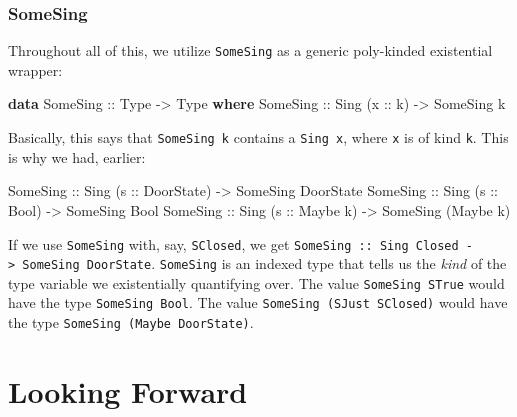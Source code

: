 \documentclass[]{article}
\newenvironment{Shaded}{}{}
\newcommand{\DataTypeTok}[1]{\textcolor[rgb]{0.56,0.13,0.00}{#1}}
\newcommand{\KeywordTok}[1]{\textcolor[rgb]{0.00,0.44,0.13}{\textbf{#1}}}
\newcommand{\NormalTok}[1]{#1}
\newcommand{\OtherTok}[1]{\textcolor[rgb]{0.00,0.44,0.13}{#1}}
\begin{document}
\hypertarget{somesing}{%
\subsubsection{SomeSing}\label{somesing}}

Throughout all of this, we utilize \texttt{SomeSing} as a generic poly-kinded
existential wrapper:

\begin{Shaded}
\begin{Highlighting}[]
\KeywordTok{data} \DataTypeTok{SomeSing}\OtherTok{ ::} \DataTypeTok{Type} \OtherTok{->} \DataTypeTok{Type} \KeywordTok{where}
    \DataTypeTok{SomeSing}\OtherTok{ ::} \DataTypeTok{Sing}\NormalTok{ (}\OtherTok{x ::}\NormalTok{ k) }\OtherTok{->} \DataTypeTok{SomeSing}\NormalTok{ k}
\end{Highlighting}
\end{Shaded}

Basically, this says that \texttt{SomeSing\ k} contains a \texttt{Sing\ x},
where \texttt{x} is of kind \texttt{k}. This is why we had, earlier:

\begin{Shaded}
\begin{Highlighting}[]
\DataTypeTok{SomeSing}\OtherTok{ ::} \DataTypeTok{Sing}\NormalTok{ (}\OtherTok{s ::} \DataTypeTok{DoorState}\NormalTok{) }\OtherTok{->} \DataTypeTok{SomeSing} \DataTypeTok{DoorState}
\DataTypeTok{SomeSing}\OtherTok{ ::} \DataTypeTok{Sing}\NormalTok{ (}\OtherTok{s ::} \DataTypeTok{Bool}\NormalTok{)      }\OtherTok{->} \DataTypeTok{SomeSing} \DataTypeTok{Bool}
\DataTypeTok{SomeSing}\OtherTok{ ::} \DataTypeTok{Sing}\NormalTok{ (}\OtherTok{s ::} \DataTypeTok{Maybe}\NormalTok{ k)   }\OtherTok{->} \DataTypeTok{SomeSing}\NormalTok{ (}\DataTypeTok{Maybe}\NormalTok{ k)}
\end{Highlighting}
\end{Shaded}

If we use \texttt{SomeSing} with, say, \texttt{SClosed}, we get
\texttt{SomeSing\ ::\ Sing\ \textquotesingle{}Closed\ -\textgreater{}\ SomeSing\ DoorState}.
\texttt{SomeSing} is an indexed type that tells us the \emph{kind} of the type
variable we existentially quantifying over. The value \texttt{SomeSing\ STrue}
would have the type \texttt{SomeSing\ Bool}. The value
\texttt{SomeSing\ (SJust\ SClosed)} would have the type
\texttt{SomeSing\ (Maybe\ DoorState)}.

\hypertarget{looking-forward}{%
\section{Looking Forward}\label{looking-forward}}
\end{document}
